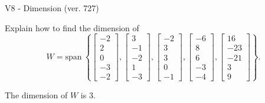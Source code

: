 \begin{exercise}
  \begin{exerciseTitle}V8 - Dimension (ver. 727)\end{exerciseTitle}
  \begin{exerciseStatement}
    Explain how to find the dimension of 
\[W=\mathrm{span}\ \left\{\left[\begin{array}{r}
-2 \\
2 \\
0 \\
-3 \\
-2
\end{array}\right] , \left[\begin{array}{r}
3 \\
-1 \\
-2 \\
1 \\
-3
\end{array}\right] , \left[\begin{array}{r}
-2 \\
3 \\
3 \\
0 \\
-1
\end{array}\right] , \left[\begin{array}{r}
-6 \\
8 \\
6 \\
-3 \\
-4
\end{array}\right] , \left[\begin{array}{r}
16 \\
-23 \\
-21 \\
3 \\
9
\end{array}\right]\right\}.\]



  \end{exerciseStatement}
  \begin{exerciseAnswer}
   The dimension of \(W\) is  \(3\).
  


  \end{exerciseAnswer}
\end{exercise}
